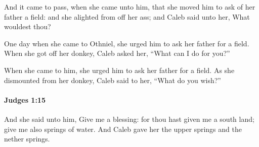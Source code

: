 			\begin{versebox}
					\item[BHS] 
					\item[ASV] And it came to pass, when she came unto him, that she moved him to ask of her father a field: and she alighted from off her ass; and Caleb said unto her, What wouldest thou?
					\item[NIV] One day when she came to Othniel, she urged him to ask her father for a field. When she got off her donkey, Caleb asked her, “What can I do for you?”
					\item[NRSV] When she came to him, she urged him to ask her father for a field. As she dismounted from her donkey, Caleb said to her, “What do you wish?”
			\end{versebox}

		\paragraph{Judges 1:15} %
			\label{JUDGES-1-15}

			And she said unto him, Give me a blessing: for thou hast given me a south land; give me also springs of water. And Caleb gave her the upper springs and the nether springs.

